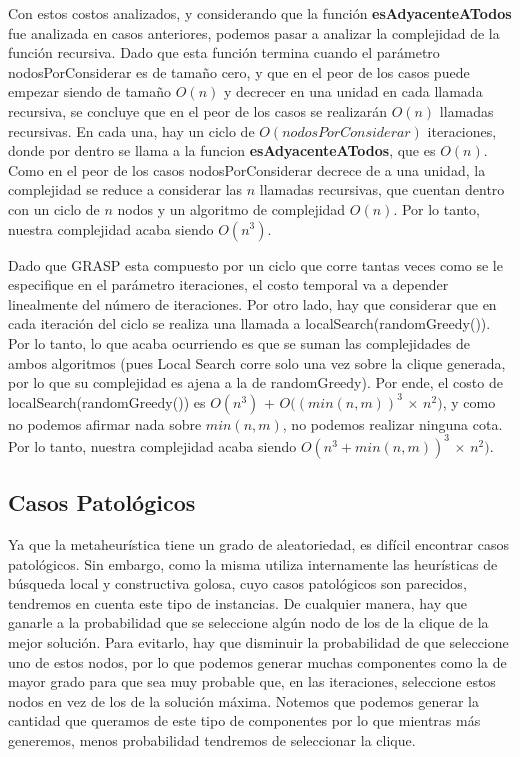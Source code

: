 Con estos costos analizados, y considerando que la función \textbf{esAdyacenteATodos} fue analizada en casos anteriores, podemos pasar a analizar la complejidad de la función recursiva. Dado que esta función termina cuando el parámetro nodosPorConsiderar es de tamaño cero, y que en el peor de los casos puede empezar siendo de tamaño $O(n)$ y decrecer en una unidad en cada llamada recursiva, se concluye que en el peor de los casos se realizarán $O(n)$ llamadas recursivas. En cada una, hay un ciclo de $O(nodosPorConsiderar)$ iteraciones, donde por dentro se llama a la funcion \textbf{esAdyacenteATodos}, que es $O(n)$. Como en el peor de los casos nodosPorConsiderar decrece de a una unidad, la complejidad se reduce a considerar las $n$ llamadas recursivas, que cuentan dentro con un ciclo de $n$ nodos y un algoritmo de complejidad $O(n)$. Por lo tanto, nuestra complejidad acaba siendo $O(n^3)$.

Dado que GRASP esta compuesto por un ciclo que corre tantas veces como se le especifique en el parámetro iteraciones, el costo temporal va a depender linealmente del número de iteraciones. Por otro lado, hay que considerar que en cada iteración del ciclo se realiza una llamada a localSearch(randomGreedy()). Por lo tanto, lo que acaba ocurriendo es que se suman las complejidades de ambos algoritmos (pues Local Search corre solo una vez sobre la clique generada, por lo que su complejidad es ajena a la de randomGreedy). Por ende, el costo de localSearch(randomGreedy()) es $O(n^3)$ + $O((min(n,m))^3$ $\times$ $n^2)$, y como no podemos afirmar nada sobre $min(n,m)$, no podemos realizar ninguna cota. Por lo tanto, nuestra complejidad acaba siendo $O(n^3 + min(n,m))^3$ $\times$ $n^2)$.

\subsection{Casos Patológicos}

Ya que la metaheurística tiene un grado de aleatoriedad, es difícil encontrar casos patológicos. Sin embargo, como la misma utiliza internamente las heurísticas de búsqueda local y constructiva golosa, cuyo casos patológicos son parecidos, tendremos en cuenta este tipo de instancias. De cualquier manera, hay que ganarle a la probabilidad que se seleccione algún nodo de los de la clique de la mejor solución. Para evitarlo, hay que disminuir la probabilidad de que seleccione uno de estos nodos, por lo que podemos generar muchas componentes como la de mayor grado para que sea muy probable que, en las iteraciones, seleccione estos nodos en vez de los de la solución máxima. Notemos que podemos generar la cantidad que queramos de este tipo de componentes por lo que mientras más generemos, menos probabilidad tendremos de seleccionar la clique.
